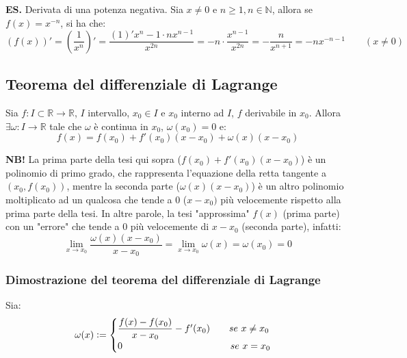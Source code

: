 \documentclass{article}
\begin{document}
\noindent\textbf{ES.} Derivata di una potenza negativa. Sia $x \neq 0$ e $n \geq 1, n \in \mathbb{N}$, allora se $f(x) = x^{-n}$, si ha che:
\begin{equation*}
    (f(x))' = \left(\frac{1}{x^n}\right)' = \frac{(1)'x^n - 1 \cdot nx^{n - 1}}{x^{2n}} = -n \cdot \frac{x^{n - 1}}{x^{2n}} = - \frac{n}{x^{n + 1}} = -nx^{-n - 1} \qquad (x \neq 0)
\end{equation*} 

\subsection{Teorema del differenziale di Lagrange}
Sia $f: I \subset \mathbb{R} \xrightarrow{} \mathbb{R}$, $I$ intervallo, $x_0 \in I$ e $x_0$ interno ad $I$, $f$ derivabile in $x_0$. Allora $\exists \omega: I \xrightarrow{} \mathbb{R}$ tale che $\omega$ è continua in $x_0$, $\omega(x_0) = 0$ e:
\begin{equation*}
    f(x) = f(x_0) + f'(x_0)(x - x_0) + \omega(x)(x - x_0)
\end{equation*}

\noindent\textbf{NB!} La prima parte della tesi qui sopra ($f(x_0) + f'(x_0)(x - x_0)$) è un polinomio di primo grado, che rappresenta l'equazione della retta tangente a $(x_0, f(x_0))$, mentre la seconda parte ($\omega(x)(x - x_0)$) è un altro polinomio moltiplicato ad un qualcosa che tende a $0$ ($x - x_0)$ più velocemente rispetto alla prima parte della tesi. In altre parole, la tesi "approssima" $f(x)$ (prima parte) con un "errore" che tende a $0$ più velocemente di $x - x_0$ (seconda parte), infatti:
\begin{equation*}
    \lim_{x \to x_0} \frac{\omega(x)(x - x_0)}{x - x_0} = \lim_{x \to x_0} \omega(x) = \omega(x_0) = 0
\end{equation*}

\subsubsection{Dimostrazione del teorema del differenziale di Lagrange}
Sia:
\begin{equation*}
    \omega(x) \vcentcolon = \begin{cases}
        \dfrac{f(x) - f(x_0)}{x - x_0} - f'(x_0) \qquad se \ x \neq x_0\\
        0 \qquad \qquad \qquad \qquad \qquad \quad \ se \ x = x_0
    \end{cases}
\end{equation*}
\end{document}
